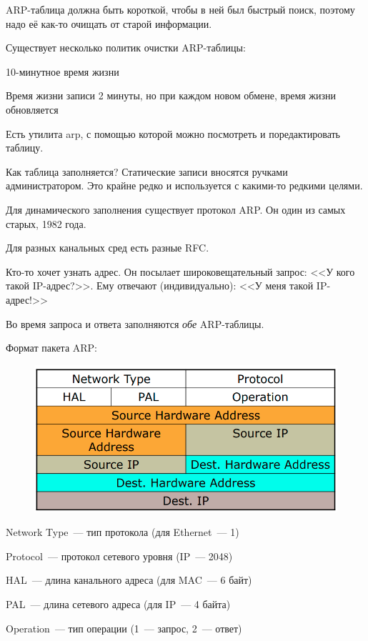 ARP-таблица должна быть короткой, чтобы в ней был быстрый поиск, поэтому надо её как-то очищать от старой информации. 

Существует несколько политик очистки ARP-таблицы:
\begin{MyItemize}
    \item 10-минутное время жизни
    \item Время жизни записи 2 минуты, но при каждом новом обмене, время жизни обновляется
\end{MyItemize}

Есть утилита arp, с помощью которой можно посмотреть и поредактировать таблицу.

Как таблица заполняется? Статические записи вносятся ручками администратором. Это крайне редко и используется с какими-то редкими целями.


Для динамического заполнения существует протокол ARP. Он один из самых старых, 1982 года. 

Для разных канальных сред есть разные RFC.

Кто-то хочет узнать адрес. Он посылает широковещательный запрос: <<У кого такой IP-адрес?>>. Ему отвечают (индивидуально): <<У меня такой IP-адрес!>>

Во время запроса и ответа заполняются {\it обе} ARP-таблицы.

Формат пакета ARP:

\begin{figure}[H]
  \centering
  \includegraphics[width=15cm]{images/02/06}
\end{figure}

\begin{MyItemize}
    \item Network Type~--- тип протокола (для Ethernet~--- 1)
    \item Protocol~--- протокол сетевого уровня (IP~--- 2048)
    \item HAL~--- длина канального адреса (для MAC~--- 6 байт)
    \item PAL~--- длина сетевого адреса (для IP~--- 4 байта)
    \item Operation~--- тип операции (1~--- запрос, 2~--- ответ)
\end{MyItemize}

